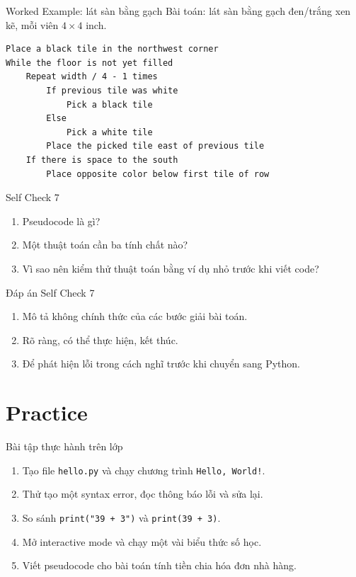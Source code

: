 \documentclass[aspectratio=169,10pt]{beamer}
\begin{document}
\begin{frame}[fragile]{Worked Example: lát sàn bằng gạch}
Bài toán: lát sàn bằng gạch đen/trắng xen kẽ, mỗi viên \(4 \times 4\) inch.

\begin{lstlisting}[language={}]
Place a black tile in the northwest corner
While the floor is not yet filled
    Repeat width / 4 - 1 times
        If previous tile was white
            Pick a black tile
        Else
            Pick a white tile
        Place the picked tile east of previous tile
    If there is space to the south
        Place opposite color below first tile of row
\end{lstlisting}
\end{frame}

\begin{frame}{Self Check 7}
\begin{enumerate}
  \item Pseudocode là gì?
  \item Một thuật toán cần ba tính chất nào?
  \item Vì sao nên kiểm thử thuật toán bằng ví dụ nhỏ trước khi viết code?
\end{enumerate}
\end{frame}

\begin{frame}{Đáp án Self Check 7}
\begin{enumerate}
  \item Mô tả không chính thức của các bước giải bài toán.
  \item Rõ ràng, có thể thực hiện, kết thúc.
  \item Để phát hiện lỗi trong cách nghĩ trước khi chuyển sang Python.
\end{enumerate}
\end{frame}

\section{Practice}

\begin{frame}{Bài tập thực hành trên lớp}
\begin{enumerate}
  \item Tạo file \texttt{hello.py} và chạy chương trình \texttt{Hello, World!}.
  \item Thử tạo một syntax error, đọc thông báo lỗi và sửa lại.
  \item So sánh \texttt{print("39 + 3")} và \texttt{print(39 + 3)}.
  \item Mở interactive mode và chạy một vài biểu thức số học.
  \item Viết pseudocode cho bài toán tính tiền chia hóa đơn nhà hàng.
\end{enumerate}
\end{frame}
\end{document}
